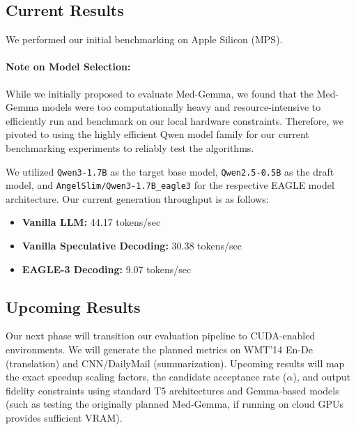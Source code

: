 \documentclass[11pt]{article}
\begin{document}
\subsection{Current Results}
We performed our initial benchmarking on Apple Silicon (MPS). 

\paragraph{Note on Model Selection:} While we initially proposed to evaluate Med-Gemma, we found that the Med-Gemma models were too computationally heavy and resource-intensive to efficiently run and benchmark on our local hardware constraints. Therefore, we pivoted to using the highly efficient Qwen model family for our current benchmarking experiments to reliably test the algorithms.

We utilized \texttt{Qwen3-1.7B} as the target base model, \texttt{Qwen2.5-0.5B} as the draft model, and \texttt{AngelSlim/Qwen3-1.7B\_eagle3} for the respective EAGLE model architecture. Our current generation throughput is as follows:
\begin{itemize}
    \item \textbf{Vanilla LLM:} 44.17 tokens/sec
    \item \textbf{Vanilla Speculative Decoding:} 30.38 tokens/sec
    \item \textbf{EAGLE-3 Decoding:} 9.07 tokens/sec 
\end{itemize}

\subsection{Upcoming Results}
Our next phase will transition our evaluation pipeline to CUDA-enabled environments. We will generate the planned metrics on WMT'14 En-De (translation) and CNN/DailyMail (summarization). Upcoming results will map the exact speedup scaling factors, the candidate acceptance rate ($\alpha$), and output fidelity constraints using standard T5 architectures and Gemma-based models (such as testing the originally planned Med-Gemma, if running on cloud GPUs provides sufficient VRAM).
\end{document}
